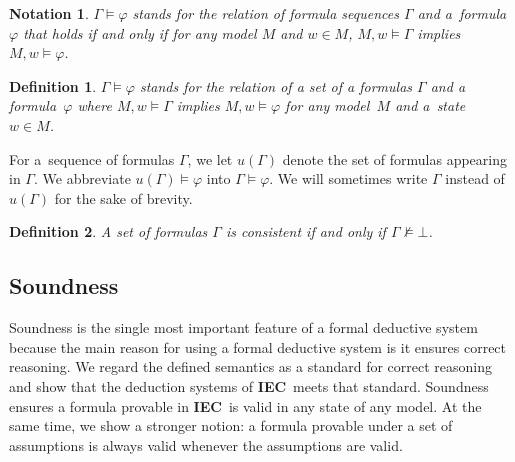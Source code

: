 \documentclass[doctor]{iscs-thesis}
\newcommand{\iec}{{\rm {\textbf{IEC}}}}
\newtheorem{notation}{Notation}
\newtheorem{definition}{Definition}
\begin{document}
\begin{notation}
$\Gamma\models\varphi$ stands for the relation of formula
 sequences $\Gamma$ and a~formula
 $\varphi$ that holds if and only if for any model $M$ 
and $w\in M$, $M,w\models \Gamma$ implies
 $M,w\models \varphi$.
\end{notation}

\begin{definition}
$\Gamma\models\varphi$ stands for the relation of a set of a formulas
 $\Gamma$ and a formula~$\varphi$ where $M,w\models \Gamma$ implies
 $M,w\models \varphi$ for any model~$M$ 
and a~state~$w\in M$.
\end{definition}
For a~sequence of formulas $\Gamma$, we let $u(\Gamma)$ denote the set of formulas
appearing in $\Gamma$.  We abbreviate $u(\Gamma)\models\varphi$ into
$\Gamma\models\varphi$. We will sometimes write $\Gamma$ instead of $u(\Gamma)$ for the
sake of brevity.

\begin{definition}
 A set of formulas $\Gamma$ is consistent if and only if $\Gamma\not\models \bot$.
\end{definition}

\subsection{Soundness}

Soundness is the single most important feature of a formal deductive system because the
main reason for using a formal deductive system is it ensures correct reasoning.
We regard the defined semantics as a standard for correct reasoning and show that the
deduction systems of \iec\, meets that standard.
Soundness ensures a formula provable in \iec\, is valid in any state of any model.
At the same time, we show a stronger notion:
a formula provable under a set of assumptions is always valid whenever the assumptions are
valid.
\end{document}
